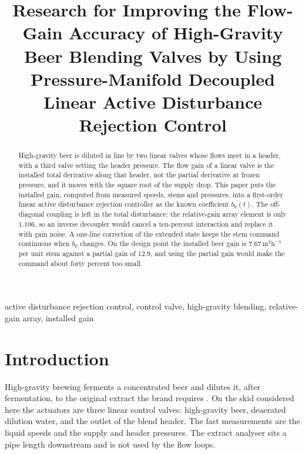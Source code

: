 \documentclass[conference,a4paper]{IEEEtran}
\title{Research for Improving the Flow-Gain Accuracy of High-Gravity Beer Blending Valves by Using Pressure-Manifold Decoupled Linear Active Disturbance Rejection Control}
\author{%
\IEEEauthorblockN{Thesis draft}%
\IEEEauthorblockA{Automatic control, 2026}%
}
\begin{document}
\maketitle

\begin{abstract}
High-gravity beer is diluted in line by two linear valves whose flows meet in a header, with a third valve setting the header pressure. The flow gain of a linear valve is the installed total derivative along that header, not the partial derivative at frozen pressure, and it moves with the square root of the supply drop. This paper puts the installed gain, computed from measured speeds, stems and pressures, into a first-order linear active disturbance rejection controller as the known coefficient $b_0(t)$. The off-diagonal coupling is left in the total disturbance: the relative-gain array element is only $1.106$, so an inverse decoupler would cancel a ten-percent interaction and replace it with gain noise. A one-line correction of the extended state keeps the stem command continuous when $b_0$ changes. On the design point the installed beer gain is $7.67\,\mathrm{m}^3\mathrm{h}^{-1}$ per unit stem against a partial gain of $12.9$, and using the partial gain would make the command about forty percent too small.
\end{abstract}

\begin{IEEEkeywords}
active disturbance rejection control, control valve, high-gravity blending, relative-gain array, installed gain
\end{IEEEkeywords}

\section{Introduction}
High-gravity brewing ferments a concentrated beer and dilutes it, after fermentation, to the original extract the brand requires \cite{kunze2014brewing,stewart2010highgravity}. On the skid considered here the actuators are three linear control valves: high-gravity beer, deaerated dilution water, and the outlet of the blend header. The fast measurements are the liquid speeds and the supply and header pressures. The extract analyser sits a pipe length downstream and is not used by the flow loops.
\end{document}
